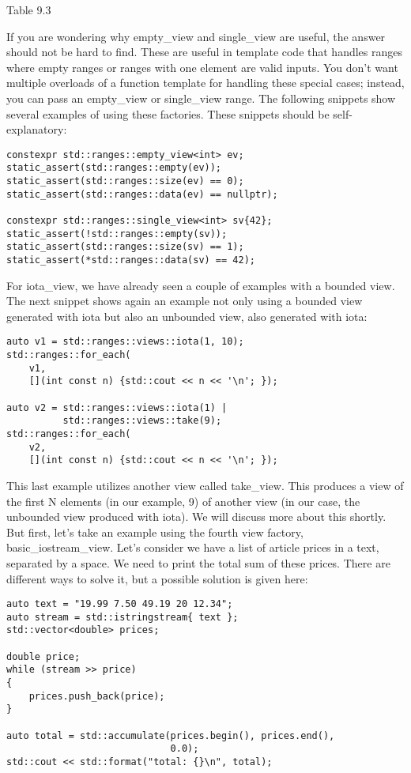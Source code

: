 \begin{center}
Table 9.3
\end{center}

If you are wondering why empty\_view and single\_view are useful, the answer should not be hard to find. These are useful in template code that handles ranges where empty ranges or ranges with one element are valid inputs. You don’t want multiple overloads of a function template for handling these special cases; instead, you can pass an empty\_view or single\_view range. The following snippets show several examples of using these factories. These snippets should be self-explanatory:

\begin{lstlisting}[style=styleCXX]
constexpr std::ranges::empty_view<int> ev;
static_assert(std::ranges::empty(ev));
static_assert(std::ranges::size(ev) == 0);
static_assert(std::ranges::data(ev) == nullptr);

constexpr std::ranges::single_view<int> sv{42};
static_assert(!std::ranges::empty(sv));
static_assert(std::ranges::size(sv) == 1);
static_assert(*std::ranges::data(sv) == 42);
\end{lstlisting}

For iota\_view, we have already seen a couple of examples with a bounded view. The next snippet shows again an example not only using a bounded view generated with iota but also an unbounded view, also generated with iota:

\begin{lstlisting}[style=styleCXX]
auto v1 = std::ranges::views::iota(1, 10);
std::ranges::for_each(
	v1,
	[](int const n) {std::cout << n << '\n'; });
	
auto v2 = std::ranges::views::iota(1) |
		  std::ranges::views::take(9);
std::ranges::for_each(
	v2,
	[](int const n) {std::cout << n << '\n'; });
\end{lstlisting}

This last example utilizes another view called take\_view. This produces a view of the first N elements (in our example, 9) of another view (in our case, the unbounded view produced with iota). We will discuss more about this shortly. But first, let’s take an example using the fourth view factory, basic\_iostream\_view. Let’s consider we have a list of article prices in a text, separated by a space. We need to print the total sum of these prices. There are different ways to solve it, but a possible solution is given here:

\begin{lstlisting}[style=styleCXX]
auto text = "19.99 7.50 49.19 20 12.34";
auto stream = std::istringstream{ text };
std::vector<double> prices;

double price;
while (stream >> price)
{
	prices.push_back(price);
}

auto total = std::accumulate(prices.begin(), prices.end(),
							 0.0);
std::cout << std::format("total: {}\n", total);
\end{lstlisting}

